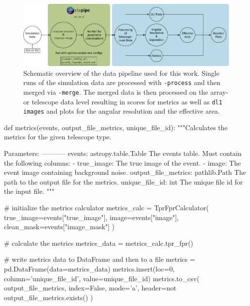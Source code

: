 \begin{figure}
    \centering
    \includegraphics[width=\textwidth]{graphics/data_pipeline.pdf}
    \caption{Schematic overview of the data pipeline used for this work. Single runs of the simulation
    data are processed with \ctapipe\texttt{-process} and then merged via \ctapipe\texttt{-merge}.
    The merged data is then processed on the array- or telescope data level resulting in scores for metrics
    as well as \texttt{dl1 images} and plots for the angular resolution and the effective area.}
    \label{fig:data-processing}
\end{figure}

\begin{minipage}{\textwidth}
  \begin{mdframed}[backgroundcolor=white!20!black,leftmargin=0cm,rightmargin=0cm, skipabove=0pt, innerleftmargin=0,innerrightmargin=0,]
  \begin{pythonlst}
    def metrics(events, output_file_metrics, unique_file_id):
        """Calculates the metrics for the given telescope type.

        Parameters:
        -----------
        events: astropy.table.Table
            The events table. Must contain the following columns:
            - true_image: The true image of the event.
            - image: The event image containing background noise.
        output_file_metrics: pathlib.Path
            The path to the output file for the metrics.
        unique_file_id: int
            The unique file id for the input file.
        """

        # initialize the metrics calculator
        metrics_calc = TprFprCalculator(
            true_image=events["true_image"],
            image=events["image"],
            clean_mask=events["image_mask"]
        )

        # calculate the metrics
        metrics_data = metrics_calc.tpr_fpr()

        # write metrics data to DataFrame and then to a file
        metrics = pd.DataFrame(data=metrics_data)
        metrics.insert(loc=0, column='unique_file_id', value=unique_file_id)
        metrics.to_csv(
            output_file_metrics,
            index=False,
            mode='a',
            header=not output_file_metrics.exists()
        )
  \end{pythonlst}
  \end{mdframed}
\end{minipage}

